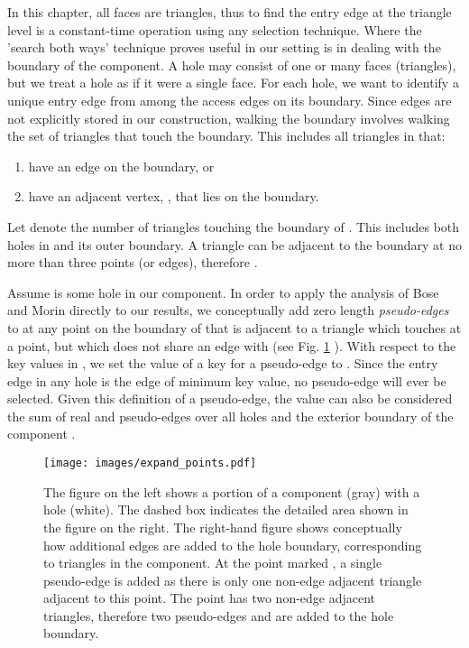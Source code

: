   In this chapter, all faces are triangles, thus to find the entry edge
  at the triangle level is a constant-time operation using any
  selection technique.
  Where the 'search both ways' technique proves useful in our setting 
  is in dealing with the boundary of the component. 
  A hole may consist of 
  one or many faces (triangles), but we treat a hole as if it were a 
  single face.
  For each hole, we want to identify a unique entry edge from among
  the access edges on its boundary.
  Since edges are not explicitly stored in our construction, walking
  the boundary involves walking the set of triangles that touch the boundary. 
  This includes all triangles in  that:
  
  \begin{enumerate}
  \item have an edge on the boundary, or
  \item have an adjacent vertex, , that lies on the boundary.
  \end{enumerate}
  
  Let  denote the number of triangles touching the boundary of
  . 
  This includes both holes in  and its outer boundary.
  A triangle can be adjacent to the boundary at no more than three 
  points (or edges), therefore 
  . 
  
  Assume  is some hole in our component. 
  In order to apply the analysis of Bose and Morin directly to our results, 
  we conceptually add zero length
  \emph{pseudo-edges} to  at any point on the boundary of  that 
  is adjacent to a triangle  which touches  at a point, but which 
  does not share an edge with  (see Fig. \ref{fig:pseudo-face} ). 
  With respect to the key values in , we set the value of 
  a key for a pseudo-edge to . 
  Since the entry edge in any hole is the edge of minimum key value, 
  no pseudo-edge will ever be selected. 
  Given this definition of a pseudo-edge, the value  can also 
  be considered the sum of real and pseudo-edges over all holes 
  and the exterior boundary of the component .

  \begin{figure}[th]
	  \centering
		  \texttt{[image: images/expand\_points.pdf]}
	  \caption[Pseudo-edges in region boundaries]{The figure on the left 
    shows a portion of a component (gray) with a hole (white). 
	  The dashed box indicates the detailed area shown in the figure on the
	  right. 
	  The right-hand figure shows conceptually how additional edges are 
	  added to the hole boundary, corresponding to triangles in the component.
	  At the point marked , a single pseudo-edge is added as there is 
	  only one non-edge adjacent triangle adjacent to this point. 
	  The point  has two non-edge adjacent triangles, therefore two pseudo-edges 
	   and  are added to the hole boundary. }
	  \label{fig:pseudo-face}
  \end{figure}

